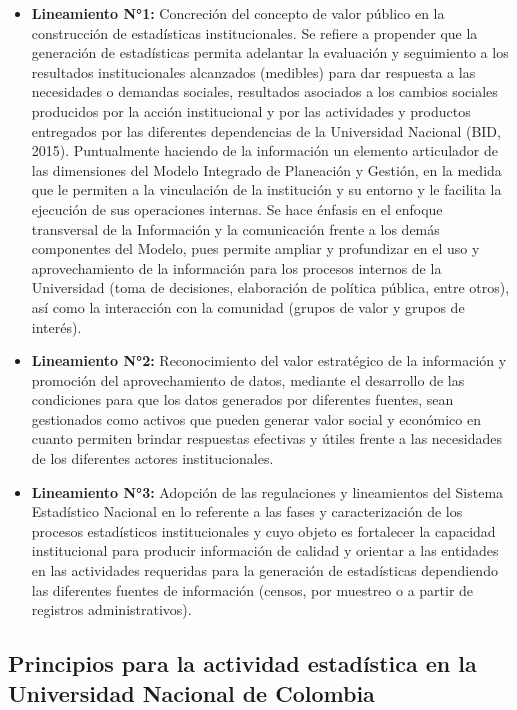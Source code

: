 \documentclass[
]{book}
\begin{document}
\begin{itemize}
\item
  \textbf{Lineamiento N°1:} Concreción del concepto de valor público en la construcción de estadísticas institucionales. Se refiere a propender que la generación de estadísticas permita adelantar la evaluación y seguimiento a los resultados institucionales alcanzados (medibles) para dar respuesta a las necesidades o demandas sociales, resultados asociados a los cambios sociales producidos por la acción institucional y por las actividades y productos entregados por las diferentes dependencias de la Universidad Nacional (BID, 2015). Puntualmente haciendo de la información un elemento articulador de las dimensiones del Modelo Integrado de Planeación y Gestión, en la medida que le permiten a la vinculación de la institución y su entorno y le facilita la ejecución de sus operaciones internas. Se hace énfasis en el enfoque transversal de la Información y la comunicación frente a los demás componentes del Modelo, pues permite ampliar y profundizar en el uso y aprovechamiento de la información para los procesos internos de la Universidad (toma de decisiones, elaboración de política pública, entre otros), así como la interacción con la comunidad (grupos de valor y grupos de interés).
\item
  \textbf{Lineamiento N°2:} Reconocimiento del valor estratégico de la información y promoción del aprovechamiento de datos, mediante el desarrollo de las condiciones para que los datos generados por diferentes fuentes, sean gestionados como activos que pueden generar valor social y económico en cuanto permiten brindar respuestas efectivas y útiles frente a las necesidades de los diferentes actores institucionales.
\item
  \textbf{Lineamiento N°3:} Adopción de las regulaciones y lineamientos del Sistema Estadístico Nacional en lo referente a las fases y caracterización de los procesos estadísticos institucionales y cuyo objeto es fortalecer la capacidad institucional para producir información de calidad y orientar a las entidades en las actividades requeridas para la generación de estadísticas dependiendo las diferentes fuentes de información (censos, por muestreo o a partir de registros
  administrativos).
\end{itemize}

\hypertarget{principios-para-la-actividad-estaduxedstica-en-la-universidad-nacional-de-colombia}{%
\subsection{Principios para la actividad estadística en la Universidad Nacional de Colombia}\label{principios-para-la-actividad-estaduxedstica-en-la-universidad-nacional-de-colombia}}
\end{document}
